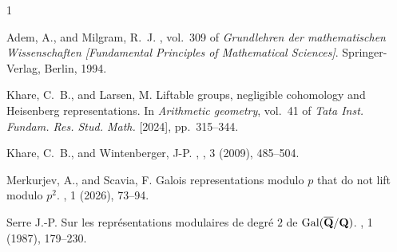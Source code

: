 \documentclass[12pt]{amsart}
\numberwithin{equation}{section}
\theoremstyle{definition}
\renewcommand{\(}{\bigl(}
\renewcommand{\)}{\bigr)}
\newcommand{\Gal}{\operatorname{Gal}}
\begin{document}
\def\cprime{$'$} \def\cprime{$'$}
\begin{thebibliography}{1}

{\sc Adem, A., and Milgram, R.~J.}
, vol.~309 of {\em Grundlehren der
  mathematischen Wissenschaften [Fundamental Principles of Mathematical
  Sciences]}.
\newblock Springer-Verlag, Berlin, 1994.

{\sc Khare, C.~B., and Larsen, M.}
\newblock Liftable groups, negligible cohomology and {H}eisenberg
  representations.
\newblock In {\em Arithmetic geometry}, vol.~41 of {\em Tata Inst. Fundam. Res.
  Stud. Math.}  [2024],   pp.~315--344.


{\sc Khare, C.~B., and Wintenberger, J-P.}
    , 
   , 3 (2009), 485--504.

{\sc Merkurjev, A., and Scavia, F.}
\newblock Galois representations modulo {$p$} that do not lift modulo {$p^2$}.
, 1 (2026), 73--94.

{\sc Serre J.-P.}
\newblock  Sur les repr\'esentations modulaires de degr\'e{} $2$ de $\Gal(\overline{\bold{Q}}/\bold{Q})$. 
, 1 (1987), 179--230.

\end{thebibliography}


%
%
\end{document}
